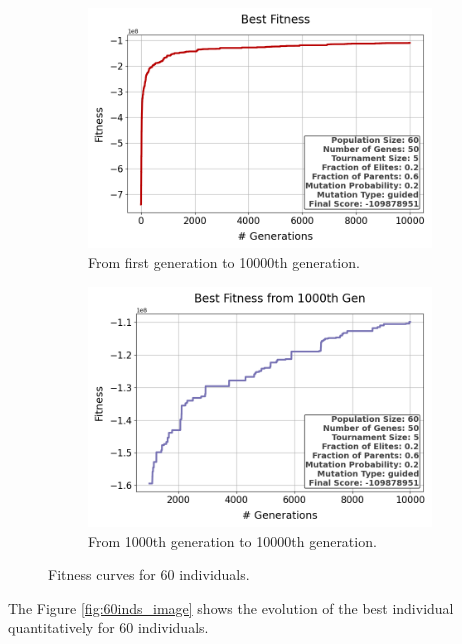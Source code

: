 \documentclass{assignment}
\begin{document}
\begin{figure}[H]
    \begin{subfigure}{0.5\textwidth}
        \includegraphics[width=\textwidth]{figures/best_fitness_output_60_50_5_0.2_0.6_0.2_guided.png}
        \caption{From first generation to 10000th generation.}
    \end{subfigure}\hfill
    \begin{subfigure}{0.5\textwidth}
        \includegraphics[width=\textwidth]{figures/best_fitness_1000_output_60_50_5_0.2_0.6_0.2_guided.png}
        \caption{From 1000th generation to 10000th generation.}
    \end{subfigure}
    \caption{Fitness curves for 60 individuals.}
\label{fig:60inds}
\end{figure}

The Figure \ref{fig:60inds_image} shows the evolution of the best individual quantitatively for 60 individuals.
\end{document}
